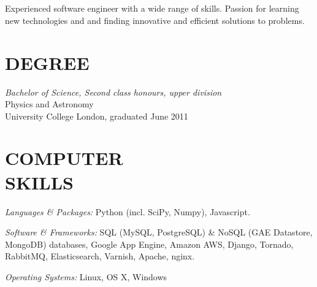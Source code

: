 \documentclass[margin, 10pt]{res} %
\begin{document}
\begin{resume}


\section{}

Experienced software engineer with a wide range of skills. Passion for learning new technologies and and finding innovative and efficient solutions to problems.


\section{DEGREE}

{\sl Bachelor of Science, Second class honours, upper division} \\
Physics and Astronomy \\
University College London, graduated June 2011


\section{COMPUTER \\ SKILLS}

{\sl Languages \& Packages:}
Python (incl. SciPy, Numpy), Javascript.

{\sl Software \& Frameworks:}
SQL (MySQL, PostgreSQL) \& NoSQL (GAE Datastore, MongoDB) databases, Google App Engine, Amazon AWS, Django, Tornado, RabbitMQ, Elasticsearch, Varnish, Apache, nginx.

{\sl Operating Systems:} Linux, OS X, Windows



\end{resume}
\end{document}
